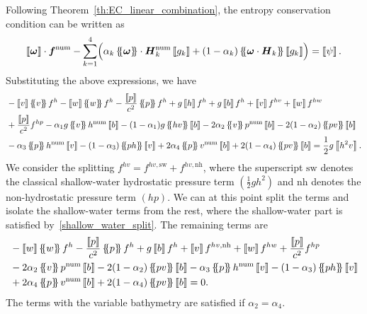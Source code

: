 \documentclass[]{scrartcl}
\newcommand*{\ldblbrace}{\{\mskip-5mu \left \{}
\newcommand*{\rdblbrace}{ \}\mskip-5mu \right \}}
\newcommand{\mean}[1]{\left\ldblbrace #1 \right\rdblbrace}
\renewcommand{\vec}[1]{\boldsymbol{#1}}
\newcommand{\jump}[1]{\left\llbracket #1  \right\rrbracket}
\theoremstyle{definition}
\begin{document}
Following Theorem~\ref{th:EC_linear_combination}, the entropy conservation condition can be written as
\begin{equation}
\jump{\vec{\omega}} \cdot \vec{f}^{\mathrm{num}} -\sum_{k=1}^4 \Bigl ( \alpha_k \mean{\vec{\omega}} \cdot \vec{H}^{\mathrm{num}}_k\jump{g_k} + (1-\alpha_k) \mean{\vec{\omega} \cdot \vec{H}_k} \jump{g_k} \Bigr ) = \jump{\psi}.
\end{equation}
Substituting the above expressions, we have
\begin{equation}
\begin{aligned}
    &
    -\jump{v}\mean{v}f^h - \jump{w}\mean{w}f^{h} - \frac{\jump{p}}{c^2}\mean{p}f^{h} + g\jump{h}f^h + g \jump{b}f^h
    + \jump{v}f^{hv} + \jump{w}f^{hw}
    \\&
    + \frac{\jump{p}}{c^2}f^{hp}
    -\alpha_1 g \mean{v} h^{\mathrm{num}}\jump{b} - (1-\alpha_1) g \mean{hv} \jump{b}
    -2 \alpha_2 \mean{v} p^{\mathrm{num}}\jump{b} - 2 (1- \alpha_2)\mean{pv}\jump{b}
    \\&
- \alpha_3 \mean{p}h^{\mathrm{num}}\jump{v}- (1-\alpha_3) \mean{ph} \jump{v} +2 \alpha_4 \mean{p}v^{\mathrm{num}}\jump{b} + 2 (1- \alpha_4)\mean{pv}\jump{b} = \frac{1}{2}g\jump{h^2v}.
\end{aligned}
\end{equation}
We consider the splitting $f^{hv} = f^{hv,\mathrm{sw}} + f^{hv,\mathrm{nh}}$, where the superscript $\mathrm{sw}$ denotes the classical shallow-water hydrostatic pressure term $\left ( \frac{1}{2}gh^2 \right )$ and $\mathrm{nh}$ denotes the non-hydrostatic pressure term $\left (hp \right )$. We can at this point split the terms and isolate the shallow-water terms from the rest, where the shallow-water part is satisfied by~\eqref{shallow_water_split}.
The remaining terms are
\begin{equation}
\begin{aligned}
    &
    - \jump{w}\mean{w}f^{h} - \frac{\jump{p}}{c^2}\mean{p}f^{h} + g \jump{b}f^h
    + \jump{v}f^{hv,\mathrm{nh}} + \jump{w}f^{hw} + \frac{\jump{p}}{c^2}f^{hp}
    \\&
    -2 \alpha_2 \mean{v} p^{\mathrm{num}}\jump{b} - 2 (1- \alpha_2)\mean{pv}\jump{b}
    - \alpha_3 \mean{p}h^{\mathrm{num}}\jump{v} - (1-\alpha_3) \mean{ph} \jump{v}
    \\&
    +2 \alpha_4 \mean{p}v^{\mathrm{num}}\jump{b} + 2 (1- \alpha_4)\mean{pv}\jump{b} = 0.
\end{aligned}
\end{equation}
The terms with the variable bathymetry are satisfied if $\alpha_2 = \alpha_4$.
\end{document}
